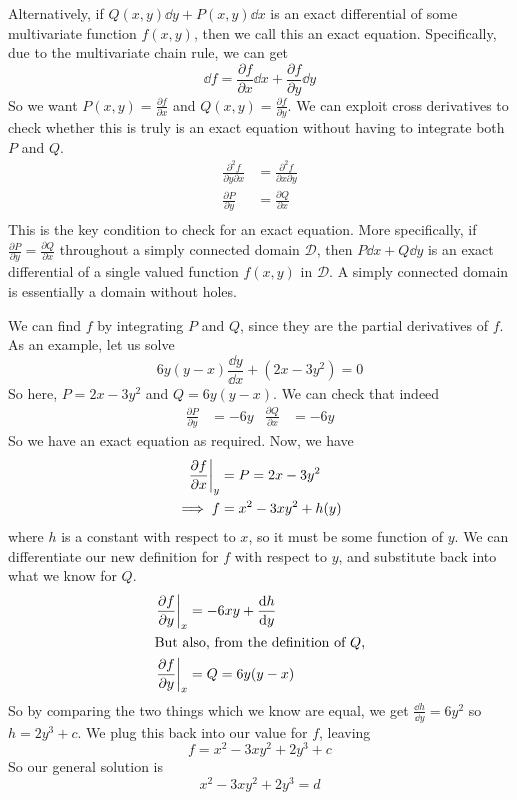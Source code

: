Alternatively, if \(Q(x, y)\dd{y} + P(x, y)\dd{x}\) is an exact differential of some multivariate function \(f(x, y)\), then we call this an exact equation.
Specifically, due to the multivariate chain rule, we can get
\[
	\dd{f} = \frac{\partial f}{\partial x} \dd{x} + \frac{\partial f}{\partial y} \dd{y}
\]
So we want \(P(x, y) = \frac{\partial f}{\partial x}\) and \(Q(x, y) = \frac{\partial f}{\partial y}\).
We can exploit cross derivatives to check whether this is truly is an exact equation without having to integrate both \(P\) and \(Q\).
\begin{align*}
	\frac{\partial^2 f}{\partial y \partial x} & = \frac{\partial^2 f}{\partial x \partial y} \\
	\frac{\partial P}{\partial y}              & = \frac{\partial Q}{\partial x}              \\
\end{align*}
This is the key condition to check for an exact equation.
More specifically, if \(\frac{\partial P}{\partial y} = \frac{\partial Q}{\partial x}\) throughout a simply connected domain \(\mathcal D\), then \(P \dd{x} + Q \dd{y}\) is an exact differential of a single valued function \(f(x, y)\) in \(\mathcal D\).
A simply connected domain is essentially a domain without holes.

We can find \(f\) by integrating \(P\) and \(Q\), since they are the partial derivatives of \(f\).
As an example, let us solve
\[
	6y(y-x)\frac{\dd{y}}{\dd{x}} + (2x - 3y^2) = 0
\]
So here, \(P = 2x - 3y^2\) and \(Q = 6y(y-x)\).
We can check that indeed
\begin{align*}
	\frac{\partial P}{\partial y} & = -6y & \frac{\partial Q}{\partial x} & = -6y
\end{align*}
So we have an exact equation as required.
Now, we have
\begin{align*}
	\eval{\frac{\partial f}{\partial x}}_y & = P = 2x - 3y^2      \\
	\implies f                             & = x^2 - 3xy^2 + h(y)
\end{align*}
where \(h\) is a constant with respect to \(x\), so it must be some function of \(y\).
We can differentiate our new definition for \(f\) with respect to \(y\), and substitute back into what we know for \(Q\).
\begin{align*}
	\eval{\frac{\partial f}{\partial y}}_x & = -6xy + \frac{\dd{h}}{\dd{y}} \\
	\intertext{But also, from the definition of \(Q\),}
	\eval{\frac{\partial f}{\partial y}}_x & = Q = 6y(y-x)                  \\
\end{align*}
So by comparing the two things which we know are equal, we get \(\frac{\dd{h}}{\dd{y}} = 6y^2\) so \(h = 2y^3 + c\).
We plug this back into our value for \(f\), leaving
\[
	f = x^2 - 3xy^2 + 2y^3 + c
\]
So our general solution is
\[
	x^2 - 3xy^2 + 2y^3 = d
\]
